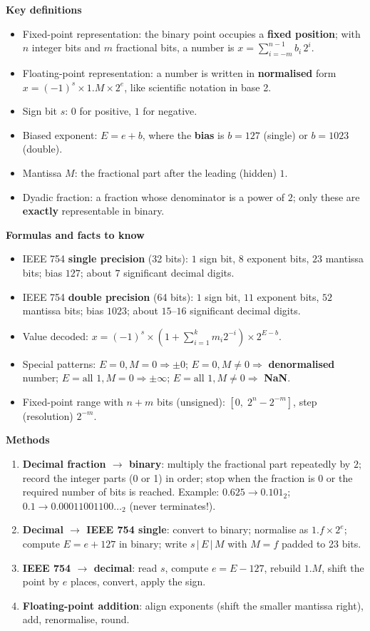 \documentclass[11pt]{article}
\newcommand{\cle}[1]{{\popxbold\color{popdark}#1}}
\begin{document}
\begin{bilan}
\textbf{Key definitions}
\begin{itemize}
\item \cle{Fixed-point representation}: the binary point occupies a \textbf{fixed position}; with $n$ integer bits and $m$ fractional bits, a number is $x=\sum_{i=-m}^{n-1} b_i\,2^i$.
\item \cle{Floating-point representation}: a number is written in \textbf{normalised} form $x=(-1)^s \times 1.M \times 2^{e}$, like scientific notation in base 2.
\item \cle{Sign bit} $s$: $0$ for positive, $1$ for negative.
\item \cle{Biased exponent}: $E = e + b$, where the \textbf{bias} is $b=127$ (single) or $b=1023$ (double).
\item \cle{Mantissa} $M$: the fractional part after the leading (hidden) $1$.
\item \cle{Dyadic fraction}: a fraction whose denominator is a power of $2$; only these are \textbf{exactly} representable in binary.
\end{itemize}

\textbf{Formulas and facts to know}
\begin{itemize}
\item IEEE 754 \textbf{single precision} (32 bits): $1$ sign bit, $8$ exponent bits, $23$ mantissa bits; bias $127$; about $7$ significant decimal digits.
\item IEEE 754 \textbf{double precision} (64 bits): $1$ sign bit, $11$ exponent bits, $52$ mantissa bits; bias $1023$; about $15$--$16$ significant decimal digits.
\item Value decoded: $x = (-1)^s \times \left(1 + \sum_{i=1}^{k} m_i 2^{-i}\right) \times 2^{E-b}$.
\item Special patterns: $E=0, M=0 \Rightarrow \pm 0$; $E=0, M\neq 0 \Rightarrow$ \textbf{denormalised} number; $E=\text{all }1, M=0 \Rightarrow \pm\infty$; $E=\text{all }1, M\neq 0 \Rightarrow$ \textbf{NaN}.
\item Fixed-point range with $n+m$ bits (unsigned): $[0,\; 2^{n}-2^{-m}]$, step (resolution) $2^{-m}$.
\end{itemize}

\textbf{Methods}
\begin{enumerate}
\item \textbf{Decimal fraction $\to$ binary}: multiply the fractional part repeatedly by $2$; record the integer parts (0 or 1) in order; stop when the fraction is $0$ or the required number of bits is reached. Example: $0.625 \to 0.101_2$; $0.1 \to 0.00011001100\ldots_2$ (never terminates!).
\item \textbf{Decimal $\to$ IEEE 754 single}: convert to binary; normalise as $1.f\times 2^{e}$; compute $E=e+127$ in binary; write $s\,|\,E\,|\,M$ with $M=f$ padded to 23 bits.
\item \textbf{IEEE 754 $\to$ decimal}: read $s$, compute $e=E-127$, rebuild $1.M$, shift the point by $e$ places, convert, apply the sign.
\item \textbf{Floating-point addition}: align exponents (shift the smaller mantissa right), add, renormalise, round.
\end{enumerate}


\end{bilan}
\end{document}
